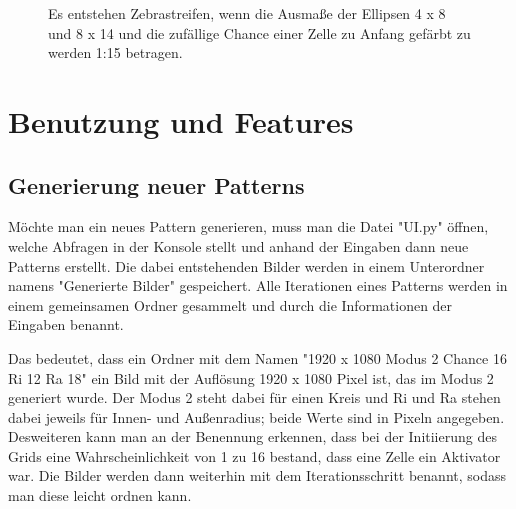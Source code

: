 \documentclass[]{article}
\begin{document}
\begin{figure}[h!]
	\caption{Es entstehen Zebrastreifen, wenn die Ausma\ss e der Ellipsen 4 x 8 und 8 x 14 und die zuf\"allige Chance einer Zelle zu Anfang gef\"arbt zu werden 1:15 betragen.}
\end{figure}


\section{Benutzung und Features}

\subsection{Generierung neuer Patterns}
M\"ochte man ein neues Pattern generieren, muss man die Datei "UI.py" \"offnen, welche Abfragen in der Konsole stellt und anhand der Eingaben dann neue Patterns erstellt. Die dabei entstehenden Bilder werden in einem Unterordner namens "Generierte Bilder" gespeichert. Alle Iterationen eines Patterns werden in einem gemeinsamen Ordner gesammelt und durch die Informationen der Eingaben benannt. 

Das bedeutet, dass ein Ordner mit dem Namen "1920 x 1080 Modus 2 Chance 16 Ri 12 Ra 18" ein Bild mit der Aufl\"osung 1920 x 1080 Pixel ist, das im Modus 2 generiert wurde. Der Modus 2 steht dabei f\"ur einen Kreis und Ri und Ra stehen dabei jeweils f\"ur Innen- und Au\ss enradius; beide Werte sind in Pixeln angegeben. Desweiteren kann man an der Benennung erkennen, dass bei der Initiierung des Grids eine Wahrscheinlichkeit von 1 zu 16 bestand, dass eine Zelle ein Aktivator war. Die Bilder werden dann weiterhin mit dem Iterationsschritt benannt, sodass man diese leicht ordnen kann.
\end{document}
